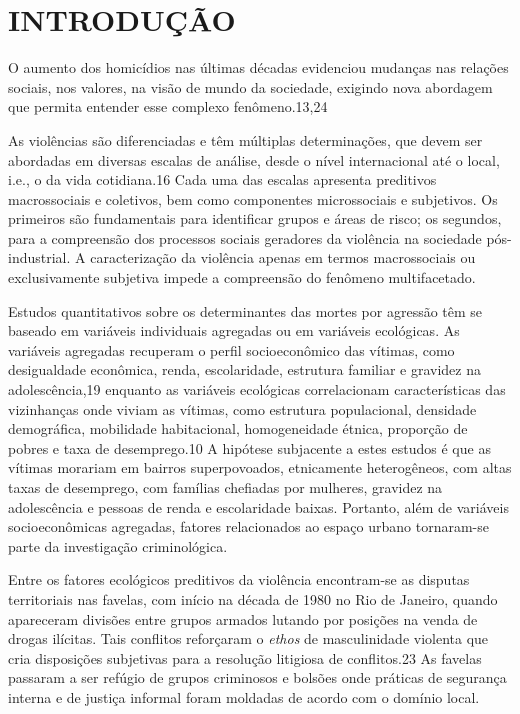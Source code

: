 \documentclass{article}
\begin{document}
\section{INTRODUÇÃO}

O aumento dos homicídios nas últimas décadas evidenciou mudanças nas relações
sociais, nos valores, na visão de mundo da sociedade, exigindo nova abordagem
que permita entender esse complexo fenômeno.13,24

As violências são diferenciadas e têm múltiplas determinações, que devem ser
abordadas em diversas escalas de análise, desde o nível internacional até o
local, i.e., o da vida cotidiana.16 Cada uma das escalas apresenta preditivos
macrossociais e coletivos, bem como componentes microssociais e subjetivos. Os
primeiros são fundamentais para identificar grupos e áreas de risco; os
segundos, para a compreensão dos processos sociais geradores da violência na
sociedade pós-industrial. A caracterização da violência apenas em termos
macrossociais ou exclusivamente subjetiva impede a compreensão do fenômeno
multifacetado.

Estudos quantitativos sobre os determinantes das mortes por agressão têm se
baseado em variáveis individuais agregadas ou em variáveis ecológicas. As
variáveis agregadas recuperam o perfil socioeconômico das vítimas, como
desigualdade econômica, renda, escolaridade, estrutura familiar e gravidez na
adolescência,19 enquanto as variáveis ecológicas correlacionam características
das vizinhanças onde viviam as vítimas, como estrutura populacional, densidade
demográfica, mobilidade habitacional, homogeneidade étnica, proporção de pobres
e taxa de desemprego.10 A hipótese subjacente a estes estudos é que as vítimas
morariam em bairros superpovoados, etnicamente heterogêneos, com altas taxas de
desemprego, com famílias chefiadas por mulheres, gravidez na adolescência e
pessoas de renda e escolaridade baixas. Portanto, além de variáveis
socioeconômicas agregadas, fatores relacionados ao espaço urbano tornaram-se
parte da investigação criminológica.

Entre os fatores ecológicos preditivos da violência encontram-se as disputas
territoriais nas favelas, com início na década de 1980 no Rio de Janeiro, quando
apareceram divisões entre grupos armados lutando por posições na venda de drogas
ilícitas. Tais conflitos reforçaram o \textit{ethos}
de masculinidade violenta que cria disposições subjetivas para a resolução
litigiosa de conflitos.23 As favelas passaram a ser refúgio de grupos criminosos
e bolsões onde práticas de segurança interna e de justiça informal foram
moldadas de acordo com o domínio local.
\end{document}
